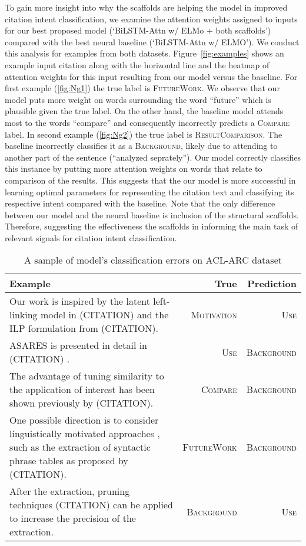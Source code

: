 \documentclass[11pt,a4paper]{article}
\newcommand{\acldata}{ACL-ARC\xspace}
\newcommand{\background}{\textsc{Background}\xspace}
\newcommand{\use}{\textsc{Use}\xspace}
\newcommand{\motivation}{\textsc{Motivation}\xspace}
\newcommand{\compare}{\textsc{Compare}\xspace}
\newcommand{\future}{\textsc{FutureWork}\xspace}
\newcommand{\result}{\textsc{ResultComparison}\xspace}
\begin{document}
To gain more insight into why the scaffolds are helping the model in improved citation intent classification, we examine the attention weights assigned to inputs for our best proposed model (`BiLSTM-Attn w/ ELMo + both scaffolds') compared with the best neural baseline (`BiLSTM-Attn w/ ELMO'). We conduct this analysis for examples from both datasets. Figure~\ref{fig:examples} shows an example input citation along with the horizontal line and the heatmap of attention weights for this input resulting from our model versus the baseline. For first example (\ref{fig:Ng1}) the true label is \future. We observe that our model puts more weight on words surrounding the word ``future'' which is plausible given the true label. On the other hand, the baseline model attends most to the words ``compare'' and consequently incorrectly predicts a \compare label. In second example (\ref{fig:Ng2}) the true label is \result. The baseline incorrectly classifies it as a \background, likely due to attending to another part of the sentence (``analyzed seprately''). Our model correctly classifies this instance by putting more attention weights on words that relate to comparison of the results. This suggests that the our model is more successful in learning optimal parameters for representing the citation text and classifying its respective intent compared with the baseline. Note that the only difference between our model and the neural baseline is inclusion of the structural scaffolds. Therefore, suggesting the effectiveness the scaffolds in informing the main task of relevant signals for citation intent classification.





\setlength{\dashlinedash}{0.5pt}
\setlength{\dashlinegap}{1.0pt}
\setlength{\arrayrulewidth}{0.1pt}

\begin{table}[]
\tiny
\centering
\setlength{\tabcolsep}{2pt}
\renewcommand{\arraystretch}{1.9}
\begin{tabular}{@{}p{4.8cm}rr@{}}
\toprule
Example & True & Prediction \\ \midrule
Our work is inspired by the latent left-linking model in (CITATION) and the ILP formulation from (CITATION). & \motivation & \use \\ \hdashline
ASARES is presented in detail in (CITATION) . & \use & \background \\ \hdashline
The advantage of tuning similarity to the application of interest has been shown previously by (CITATION). & \textsc{Compare} & \background \\ \hdashline
One possible direction is to consider linguistically motivated approaches , such as the extraction of syntactic phrase tables as proposed by (CITATION). & \future & \background \\ \hdashline
After the extraction, pruning techniques (CITATION) can be applied to increase the precision of the extraction. & \background & \use \\ \bottomrule
\end{tabular}
\caption{A sample of model's classification errors on \acldata dataset}
\label{tab:example-errors}
\end{table}
\end{document}
